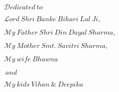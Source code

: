 

\begin{dedication} %
\vspace*{3in}
\begin{center}
\LARGE
$\mathcal Dedicated\ to$

$\mathcal Lord\ Shri\ Banke\ Bihari\ Lal\ Ji,$

$\mathcal My\ Father\ Shri\ Din\ Dayal\ Sharma,$

$\mathcal My\ Mother\ Smt.\ Savitri\ Sharma,$

$\mathcal My\ wife\ Bhawna$

$\mathcal \ and$

$\mathcal My\ kids\ Vihan\ \&\ Deepika$

\end{center}

\end{dedication}

